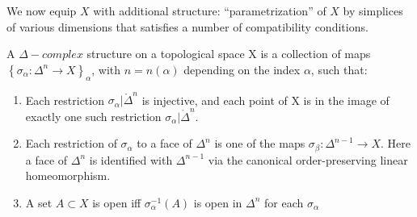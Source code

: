 \documentclass[11pt,a4paper]{report}
\begin{document}
             We now equip $X$ with additional structure: ``parametrization'' of $X$ by simplices of various dimensions that satisfies a number of 
             compatibility conditions.
             
		      \begin{defn}\label{Delta-complex}
		      	A $\Delta-complex$ structure on a topological space X is a collection of maps $\left\{\sigma_\alpha: \Delta^n \rightarrow X\right\}_\alpha $,
		      	with $n=n(\alpha)$ depending on the index $\alpha$, such that:
                    \begin{enumerate}
                        \item Each restriction $\sigma_\alpha | \mathring{\Delta}^n$ is                      injective, and each point of X is in the image of exactly one such
                        restriction $\sigma_\alpha | \mathring{\Delta}^n$.
                        \item Each restriction of $\sigma_\alpha$ to a face of $\Delta^n$ is one of the  maps
                        $\sigma_\beta: \Delta^{n-1} \rightarrow X $. Here a face of $\Delta^n$ is identified with $\Delta^{n-1}$ 
                        via the canonical order-preserving linear homeomorphism. 
                        \item A set $A \subset X$ is open iff $\sigma^{-1}_{\alpha}(A)$ is open in $\Delta^n$ for each $\sigma_\alpha$
                    \end{enumerate}

		      \end{defn}
		
		     
		     
\end{document}
